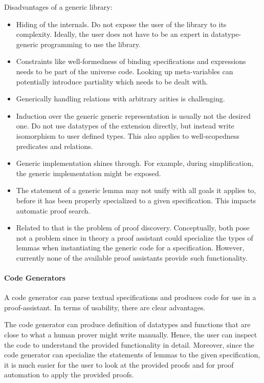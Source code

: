 Disadvantages of a generic library:
\begin{itemize}
\item Hiding of the internals. Do not expose the user of the library
  to its complexity. Ideally, the user does not have to be an expert
  in datatype-generic programming to use the library.

\item Constraints like well-formedness of binding specifications and expressions
  needs to be part of the universe code. Looking up meta-variables can
  potentially introduce partiality which needs to be dealt with.

\item Generically handling relations with arbitrary arities is challenging.

\item Induction over the generic generic representation is usually not the
  desired one. Do not use datatypes of the extension directly, but instead write
  isomorphism to user defined types. This also applies to well-scopedness
  predicates and relations.

\item Generic implementation shines through. For example, during
  simplification, the generic implementation might be exposed.

\item The statement of a generic lemma may not unify with all goals it applies
  to, before it has been properly specialized to a given specification. This
  impacts automatic proof search.

\item Related to that is the problem of proof discovery. Conceptually, both pose
  not a problem since in theory a proof assistant could specialize the types of
  lemmas when instantiating the generic code for a specification. However,
  currently none of the available proof assistants provide such functionality.
\end{itemize}


\paragraph{Code Generators}
A code generator can parse textual \Knot specifications and produces code for
use in a proof-assistant. In terms of usability, there are clear advantages.

The code generator can produce definition of datatypes and functions that are
close to what a human prover might write manually. Hence, the user can inspect
the code to understand the provided functionality in detail. Moreover, since the
code generator can specialize the statements of lemmas to the given
specification, it is much easier for the user to look at the provided proofs
and for proof automation to apply the provided proofs.

